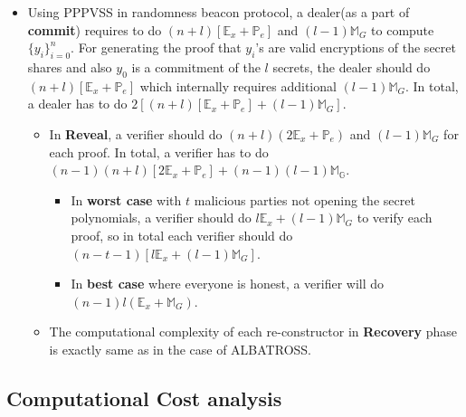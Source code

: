 \begin{itemize}
\begin{itemize}
        \end{itemize}
    \item Using PPPVSS in randomness beacon protocol, a dealer(as a part of \textbf{commit}) requires to do $(n+l)[\mathbb{E}_x+\mathbb{P}_e]$ and $(l-1)\mathbb{M}_G$ to compute $\{y_i\}_{i=0}^{n}$. For generating the proof that $y_i$'s are valid encryptions of the secret shares and also $y_0$ is a commitment of the $l$ secrets, the dealer should do $(n+l)[\mathbb{E}_x+\mathbb{P}_e]$ which internally requires additional $(l-1)\mathbb{M}_G$. In total, a dealer has to do $2\left[(n+l)[\mathbb{E}_x+\mathbb{P}_e]+(l-1)\mathbb{M}_{G}\right]$.
    \begin{itemize}
        \item In \textbf{Reveal}, a verifier should do $(n+l)(2\mathbb{E}_x+\mathbb{P}_e)$ and $(l-1)\mathbb{M}_G$ for each proof. In total, a verifier has to do $(n-1)(n+l)[2\mathbb{E}_x+\mathbb{P}_e]+(n-1)(l-1)\mathbb{M_G}$.
        \begin{itemize}
            \item In \textbf{worst case} with $t$ malicious parties not opening the secret polynomials, a verifier should do $l\mathbb{E}_x+(l-1)\mathbb{M}_G$ to verify each proof, so in total each verifier should do $(n-t-1)[l\mathbb{E}_x+(l-1)\mathbb{M}_G]$.
            \item In \textbf{best case} where everyone is honest, a verifier will do $(n-1)l(\mathbb{E}_x+\mathbb{M}_G)$.
        \end{itemize}
        \item The computational complexity of each re-constructor in \textbf{Recovery} phase is exactly same as in the case of ALBATROSS.
    \end{itemize}
\end{itemize}

\subsection{Computational Cost analysis}

